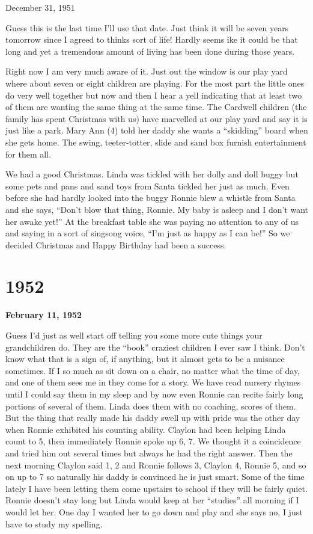 \documentclass[]{book}
\begin{document}
December 31, 1951

Guess this is the last time I'll use that date. Just think it will be seven years tomorrow since I agreed to thinks sort of life! Hardly seems ike it could be that long and yet a tremendous amount of living has been done during those years.

Right now I am very much aware of it. Just out the window is our play yard where about seven or eight children are playing. For the most part the little ones do very well together but now and then I hear a yell indicating that at least two of them are wanting the same thing at the same time. The Cardwell children (the family has spent Christmas with us) have marvelled at our play yard and say it is just like a park. Mary Ann (4) told her daddy she wants a ``skidding'' board when she gets home. The swing, teeter-totter, slide and sand box furnish entertainment for them all.

We had a good Christmas. Linda was tickled with her dolly and doll buggy but some pets and pans and sand toys from Santa tickled her just as much. Even before she had hardly looked into the buggy Ronnie blew a whistle from Santa and she says, ``Don't blow that thing, Ronnie. My baby is asleep and I don't want her awake yet!'' At the breakfast table she was paying no attention to any of us and saying in a sort of singsong voice, ``I'm just as happy as I can be!'' So we decided Christmas and Happy Birthday had been a success.

\hypertarget{section-1}{%
\chapter{1952}\label{section-1}}

\textbf{February 11, 1952}

Guess I'd just as well start off telling you some more cute things your grandchildren do. They are the ``book'' craziest children I ever saw I think. Don't know what that is a sign of, if anything, but it almost gets to be a nuisance sometimes. If I so much as sit down on a chair, no matter what the time of day, and one of them sees me in they come for a story. We have read nursery rhymes until I could say them in my sleep and by now even Ronnie can recite fairly long portions of several of them. Linda does them with no coaching, scores of them. But the thing that really made his daddy swell up with pride was the other day when Ronnie exhibited his counting ability. Claylon had been helping Linda count to 5, then immediately Ronnie spoke up 6, 7. We thought it a coincidence and tried him out several times but always he had the right answer. Then the next morning Claylon said 1, 2 and Ronnie follows 3, Claylon 4, Ronnie 5, and so on up to 7 so naturally his daddy is convinced he is just smart. Some of the time lately I have been letting them come upstairs to school if they will be fairly quiet. Ronnie doesn't stay long but Linda would keep at her ``studies'' all morning if I would let her. One day I wanted her to go down and play and she says no, I just have to study my spelling.
\end{document}
